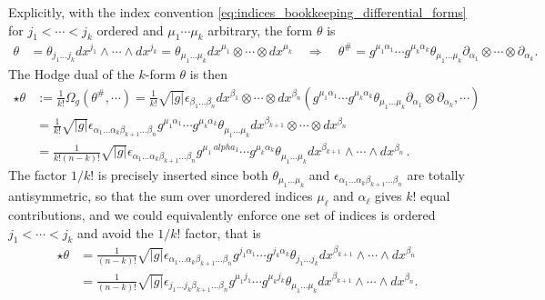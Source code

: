 \documentclass[../geometry_main.tex]{subfiles}
\begin{document}
\begin{mytheorem}
Explicitly, with the index convention \eqref{eq:indices_bookkeeping_differential_forms} for {\small $j_1<\cdots<j_k$} ordered and {\small $\mu_1\cdots\mu_k$} arbitrary, the form $\theta$ is
{\small
\begin{align}
    \theta &= \theta_{j_1 \dots j_k} dx^{j_1} \wedge \cdots \wedge dx^{j_k} = \theta_{\mu_1 \dots \mu_k} dx^{\mu_1} \otimes \cdots \otimes dx^{\mu_k}\quad \Rightarrow \quad \theta^{\#} = g^{\mu_1 \alpha_1} \cdots g^{\mu_k \alpha_k} \theta_{\mu_1 \dots \mu_k} \partial_{\alpha_1}\otimes \cdots \otimes \partial_{\alpha_k}.
\end{align}}
The Hodge dual of the \(k\)-form \(\theta\) is then 
{\small
\begin{align}\label{eq:hodge_dual_first_exp}
    \star \theta &:= \tfrac{1}{k!}\Omega_g(\theta^{\#}, \cdots)
    = \tfrac{1}{k!}\sqrt{|g|}\epsilon_{\beta_1\dots \beta_n} dx^{\beta_1} \otimes \cdots \otimes dx^{\beta_n} \left( g^{\mu_1 \alpha_1} \cdots g^{\mu_k \alpha_k} \theta_{\mu_1 \dots \mu_k} \partial_{\alpha_1}\otimes \partial_{\alpha_k}, \cdots \right)
    \\
    &= \tfrac{1}{k!}\sqrt{|g|}\epsilon_{\alpha_1\dots \alpha_k\beta_{k+1}\dots \beta_n} g^{\mu_1 \alpha_1} \cdots g^{\mu_k \alpha_k} \theta_{\mu_1 \dots \mu_k} dx^{\beta_{k+1}} \otimes \cdots \otimes dx^{\beta_n}
    \\
    &= \tfrac{1}{k!(n-k)!} \sqrt{|g|}\epsilon_{\alpha_1\dots \alpha_k\beta_{k+1}\dots \beta_n} g^{\mu_1 \ alpha_1} \cdots g^{\mu_k \alpha_k} \theta_{\mu_1 \dots \mu_k} dx^{\beta_{k+1}} \wedge \cdots \wedge dx^{\beta_n}\,.
\end{align}}
The factor $1/k!$ is precisely inserted since both $\theta_{\mu_1 \dots \mu_k}$ and $\epsilon_{\alpha_1\dots \alpha_k\beta_{k+1}\dots \beta_n}$ are totally antisymmetric, so that the sum over unordered indices $\mu_\ell$ and $\alpha_\ell$ gives $k!$ equal contributions, and we could equivalently enforce one set of indices is ordered $j_1 < \cdots < j_k$ and avoid the $1/k!$ factor, that is
{\small
\begin{align}
    \star \theta &= \tfrac{1}{(n-k)!} \sqrt{|g|}\epsilon_{\alpha_1\dots \alpha_k\beta_{k+1}\dots \beta_n} g^{j_1 \alpha_1} \cdots g^{j_k \alpha_k} \theta_{j_1 \dots j_k} dx^{\beta_{k+1}} \wedge \cdots \wedge dx^{\beta_n}\\
    &= \tfrac{1}{(n-k)!} \sqrt{|g|}\epsilon_{j_1\dots j_k\beta_{k+1}\dots \beta_n} g^{\mu_1 j_1} \cdots g^{\mu_k j_k} \theta_{\mu_1\dots\mu_k} dx^{\beta_{k+1}} \wedge \cdots \wedge dx^{\beta_n}.
\end{align}}

\end{mytheorem}
\end{document}
